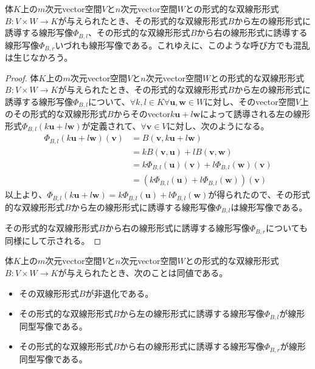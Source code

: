 \documentclass[dvipdfmx]{jsarticle}
\begin{document}
\begin{thm}\label{2.4.3.7}
体$K$上の$m$次元vector空間$V$と$n$次元vector空間$W$との形式的な双線形形式$B:V \times W \rightarrow K$が与えられたとき、その形式的な双線形形式$B$から左の線形形式に誘導する線形写像$\varPhi_{B,l}$、その形式的な双線形形式$B$から右の線形形式に誘導する線形写像$\varPhi_{B,r}$いづれも線形写像である。これゆえに、このような呼び方でも混乱は生じなかろう。
\end{thm}
\begin{proof}
体$K$上の$m$次元vector空間$V$と$n$次元vector空間$W$との形式的な双線形形式$B:V \times W \rightarrow K$が与えられたとき、その形式的な双線形形式$B$から左の線形形式に誘導する線形写像$\varPhi_{B,l}$について、$\forall k,l \in K\forall\mathbf{u},\mathbf{w} \in W$に対し、そのvector空間$V$上のその形式的な双線形形式$B$からそのvector$k\mathbf{u} + l\mathbf{w}$によって誘導される左の線形形式$\varPhi_{B,l}\left( k\mathbf{u} + l\mathbf{w} \right)$が定義されて、$\forall\mathbf{v} \in V$に対し、次のようになる。
\begin{align*}
\varPhi_{B,l}\left( k\mathbf{u} + l\mathbf{w} \right)\left( \mathbf{v} \right) &= B\left( \mathbf{v},k\mathbf{u} + l\mathbf{w} \right)\\
&= kB\left( \mathbf{v},\mathbf{u} \right) + lB\left( \mathbf{v},\mathbf{w} \right)\\
&= k\varPhi_{B,l}\left( \mathbf{u} \right)\left( \mathbf{v} \right) + l\varPhi_{B,l}\left( \mathbf{w} \right)\left( \mathbf{v} \right)\\
&= \left( k\varPhi_{B,l}\left( \mathbf{u} \right) + l\varPhi_{B,l}\left( \mathbf{w} \right) \right)\left( \mathbf{v} \right)
\end{align*}
以上より、$\varPhi_{B,l}\left( k\mathbf{u} + l\mathbf{w} \right) = k\varPhi_{B,l}\left( \mathbf{u} \right) + l\varPhi_{B,l}\left( \mathbf{w} \right)$が得られたので、その形式的な双線形形式$B$から左の線形形式に誘導する線形写像$\varPhi_{B,l}$は線形写像である。\par
その形式的な双線形形式$B$から右の線形形式に誘導する線形写像$\varPhi_{B,r}$についても同様にして示される。
\end{proof}
\begin{thm}\label{2.4.3.8}
体$K$上の$m$次元vector空間$V$と$n$次元vector空間$W$との形式的な双線形形式$B:V \times W \rightarrow K$が与えられたとき、次のことは同値である。
\begin{itemize}
\item
  その双線形形式$B$が非退化である。
\item
  その形式的な双線形形式$B$から左の線形形式に誘導する線形写像$\varPhi_{B,l}$が線形同型写像である。
\item
  その形式的な双線形形式$B$から右の線形形式に誘導する線形写像$\varPhi_{B,r}$が線形同型写像である。
\end{itemize}
\end{thm}
\end{document}
